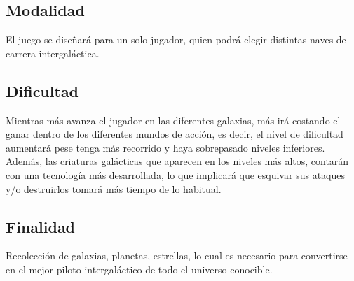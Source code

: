 \documentclass{article}
\begin{document}
\subsection{Modalidad}
El juego se diseñará para un solo jugador, quien podrá elegir distintas naves de carrera intergaláctica.

\subsection{Dificultad}
Mientras más avanza el jugador en las diferentes galaxias, más irá costando el ganar dentro de los diferentes mundos de acción, es decir, el nivel de dificultad aumentará pese tenga más recorrido y haya sobrepasado niveles inferiores. Además, las criaturas galácticas que aparecen en los niveles más altos, contarán con una tecnología más desarrollada, lo que implicará que esquivar sus ataques y/o destruirlos tomará más tiempo de lo habitual. 

\subsection{Finalidad}
Recolección de galaxias, planetas, estrellas, lo cual es necesario para convertirse en el mejor piloto intergaláctico de todo el universo conocible. 
\newpage



\cite{calistenia}
\end{document}
